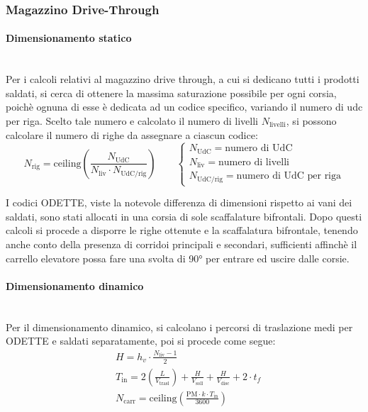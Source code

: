 \documentclass[11pt]{article}
\begin{document}
\subsubsection{Magazzino Drive-Through}
\paragraph{Dimensionamento statico}\mbox{}\\
Per i calcoli relativi al magazzino drive through, a cui si dedicano tutti i prodotti saldati, si cerca di ottenere la massima saturazione possibile per ogni corsia, poichè ognuna di esse è dedicata ad un codice specifico, variando il numero di udc per riga. Scelto tale numero e calcolato il numero di livelli $N_\text{livelli}$, si possono calcolare il numero di righe da assegnare a ciascun codice:
\begin{equation}
    N_\text{rig} = \text{ceiling}\left(\frac{N_\text{UdC}}{N_\text{liv} \cdot N_\text{UdC/rig}}\right)
    \qquad
    \begin{cases}
        N_\text{UdC} = \text{numero di UdC} \\
        N_\text{liv} = \text{numero di livelli} \\
        N_\text{UdC/rig} = \text{numero di UdC per riga}
    \end{cases}
\end{equation}

I codici ODETTE, viste la notevole differenza di dimensioni rispetto ai vani dei saldati, sono stati allocati in una corsia di sole scaffalature bifrontali.
Dopo questi calcoli si procede a disporre le righe ottenute e la scaffalatura bifrontale, tenendo anche conto della presenza di corridoi principali e secondari, sufficienti affinchè il carrello elevatore possa fare una svolta di 90° per entrare ed uscire dalle corsie.
\newpage

\paragraph{Dimensionamento dinamico}\mbox{}\\
Per il dimensionamento dinamico, si calcolano i percorsi di traslazione medi per ODETTE e saldati separatamente, poi si procede come segue:
\begin{align}
    & H = h_v \cdot \frac{N_\text{liv}-1}{2} \\
    & T_\text{in} = 2\left(\frac{L}{V_\text{trasl}}\right)+\frac{H}{V_\text{soll}}+\frac{H}{V_\text{disc}}+2\cdot t_f \\
    & N_\text{carr} = \text{ceiling}\left(\frac{\text{PM} \cdot k \cdot T_\text{in}}{3600}\right)
\end{align}
\end{document}

